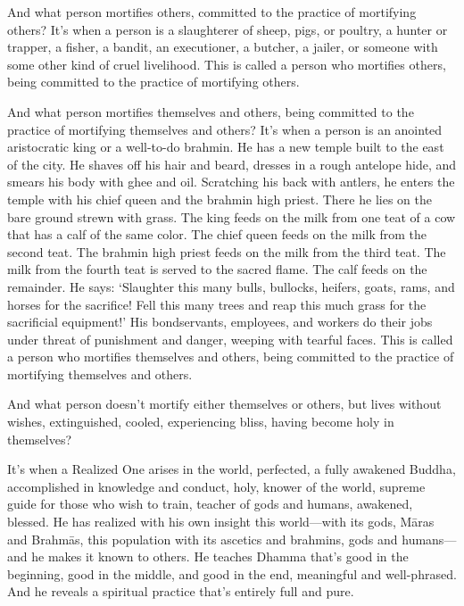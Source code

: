 \documentclass[12pt,openany]{book}%
\begin{document}
And what person mortifies others, committed to the practice of mortifying others? It’s when a person is a slaughterer of sheep, pigs, or poultry, a hunter or trapper, a fisher, a bandit, an executioner, a butcher, a jailer, or someone with some other kind of cruel livelihood. This is called a person who mortifies others, being committed to the practice of mortifying others. 

And what person mortifies themselves and others, being committed to the practice of mortifying themselves and others? It’s when a person is an anointed aristocratic king or a well-to-do brahmin. He has a new temple built to the east of the city. He shaves off his hair and beard, dresses in a rough antelope hide, and smears his body with ghee and oil. Scratching his back with antlers, he enters the temple with his chief queen and the brahmin high priest. There he lies on the bare ground strewn with grass. The king feeds on the milk from one teat of a cow that has a calf of the same color. The chief queen feeds on the milk from the second teat. The brahmin high priest feeds on the milk from the third teat. The milk from the fourth teat is served to the sacred flame. The calf feeds on the remainder. He says: ‘Slaughter this many bulls, bullocks, heifers, goats, rams, and horses for the sacrifice! Fell this many trees and reap this much grass for the sacrificial equipment!’ His bondservants, employees, and workers do their jobs under threat of punishment and danger, weeping with tearful faces. This is called a person who mortifies themselves and others, being committed to the practice of mortifying themselves and others. 

And what person doesn’t mortify either themselves or others, but lives without wishes, extinguished, cooled, experiencing bliss, having become holy in themselves? 

It’s when a Realized One arises in the world, perfected, a fully awakened Buddha, accomplished in knowledge and conduct, holy, knower of the world, supreme guide for those who wish to train, teacher of gods and humans, awakened, blessed. He has realized with his own insight this world—with its gods, \textsanskrit{Māras} and \textsanskrit{Brahmās}, this population with its ascetics and brahmins, gods and humans—and he makes it known to others. He teaches Dhamma that’s good in the beginning, good in the middle, and good in the end, meaningful and well-phrased. And he reveals a spiritual practice that’s entirely full and pure. 
\end{document}
